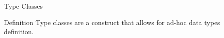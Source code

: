 \begin{frame}{Type Classes}
    \begin{block}{Definition}
        Type classes are a construct that allows for ad-hoc data types definition.
    \end{block}
\end{frame}